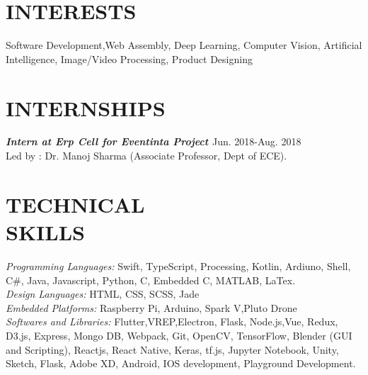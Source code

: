 \documentclass[margin, 10pt]{res}
\begin{document}
    \begin{resume}
    
     
    \section{INTERESTS}  
    
    Software Development,Web Assembly, Deep Learning, Computer Vision, Artificial Intelligence, Image/Video Processing, Product Designing
    
    
    \section{INTERNSHIPS}
    
    {\sl \bf{Intern at Erp Cell for Eventinta Project }}\null\hfill Jun. 2018-Aug. 2018\\
    Led by : Dr. Manoj Sharma (Associate Professor, Dept of ECE). 
    
    
    \section{TECHNICAL \\ SKILLS} 
    
    {\sl Programming Languages:} Swift, TypeScript, Processing, Kotlin, Ardiuno, Shell, C\#, Java, Javascript, Python, C, Embedded C, MATLAB, LaTex. \\
    {\sl Design Languages:} HTML, CSS, SCSS, Jade \\
    {\sl Embedded Platforms:} Raspberry Pi, Arduino, Spark V,Pluto Drone\\
    {\sl Softwares and Libraries:} Flutter,VREP,Electron, Flask, Node.js,Vue, Redux, D3.js, Express, Mongo DB, Webpack, Git, OpenCV, TensorFlow, Blender (GUI and Scripting), Reactjs, React Native, Keras, tf.js, Jupyter Notebook, Unity, Sketch, Flask, Adobe XD, Android, IOS development, Playground Development. 
    

\end{resume}
\end{document}
